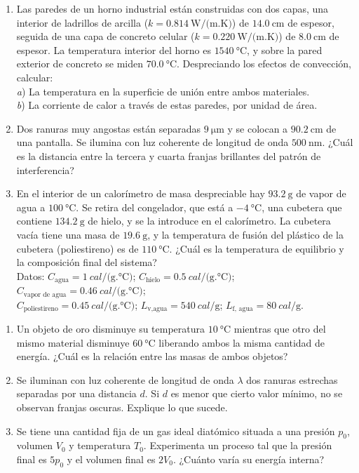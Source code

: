 \documentclass[a4paper,11pt,dvipsnames, twocolumn]{article}
\begin{document}
\begin{enumerate}[wide, labelwidth=!, labelindent=0pt]
\item Las paredes de un horno industrial están construidas con dos capas, una interior de ladrillos de arcilla ($k = \SI{0.814}{\watt/(\metre.\kelvin)}$) de $\SI{14.0}{\centi\metre}$ de espesor, seguida de una capa de concreto celular ($k = \SI{0.220}{\watt/(\metre.\kelvin)}$) de $\SI{8.0}{\centi\metre}$ de espesor. La temperatura interior del horno es $\SI{1540}{\celsius}$, y sobre la pared exterior de concreto se miden $\SI{70.0}{\celsius}$. Despreciando los efectos de convección, calcular:\\
\textit{a}) La temperatura en la superficie de unión entre ambos materiales.\\
\textit{b}) La corriente de calor a través de estas paredes, por unidad de área.

\item Dos ranuras muy angostas están separadas $\SI{9}{\micro\metre}$ y se colocan a $\SI{90.2}{\centi\metre}$ de una pantalla. Se ilumina con luz coherente de longitud de onda $\SI{500}{\nano\metre}$. ¿Cuál es la distancia entre la tercera y cuarta franjas brillantes del patrón de interferencia?


\item En el interior de un calorímetro de masa despreciable hay $\SI{93.2}{\gram}$ de vapor de agua a $\SI{100}{\celsius}$. Se retira del congelador, que está a $\SI{-4}{\celsius}$, una cubetera que contiene $\SI{134.2}{\gram}$ de hielo, y se la introduce en el calorímetro. La cubetera vacía tiene una masa de $\SI{19.6}{\gram}$, y la temperatura de fusión del plástico de la cubetera (poliestireno) es de $\SI{110}{\celsius}$. ¿Cuál es la temperatura de equilibrio y la composición final del sistema?\\
Datos: $C_\text{agua} = \SI{1}{cal/(\gram.\celsius)}$; $C_\text{hielo} = \SI{0.5}{cal/(\gram.\celsius)}$;\\ $C_\text{vapor de agua} = \SI{0.46}{cal/(\gram.\celsius)}$;\\ $C_\text{poliestireno} = \SI{0.45}{cal/(\gram.\celsius)}$; $L_\text{v,agua} = \SI{540}{cal/\gram}$; $L_\text{f, agua} = \SI{80}{cal/\gram}$.

\end{enumerate}

\begin{enumerate}[label=\roman*., wide, labelwidth=!, labelindent=0pt]
\item Un objeto de oro disminuye su temperatura $\SI{10}{\celsius}$ mientras que otro del mismo material disminuye $\SI{60}{\celsius}$ liberando ambos la misma cantidad de energía. ¿Cuál es la relación entre las masas de ambos objetos?
\item Se iluminan con luz coherente de longitud de onda $\lambda$ dos ranuras estrechas separadas por una distancia $d$. Si $d$ es menor que cierto valor mínimo, no se observan franjas oscuras. Explique lo que sucede.
\item Se tiene una cantidad fija de un gas ideal diatómico situada a una presión $p_0$, volumen $V_0$ y temperatura $T_0$. Experimenta un proceso tal que la presión final es $5p_0$ y el volumen final es $2V_0$. ¿Cuánto varía su energía interna?
\end{enumerate}

\end{document}
